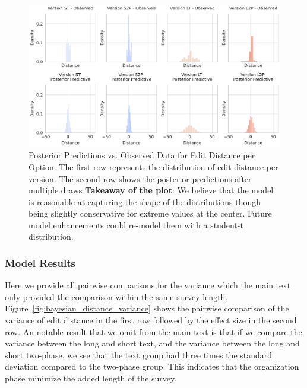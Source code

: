 \begin{figure}[h!]
    \centering
    \includegraphics[width=\textwidth]{content/image/distance/observed_vs_posterior_predictive_histogram_m2.pdf}
    \caption{Posterior Predictions vs. Observed Data for Edit Distance per Option. The first row represents the distribution of edit distance per version. The second row shows the posterior predictions after multiple draws \textbf{Takeaway of the plot}: We believe that the model is reasonable at capturing the shape of the distributions though being slightly conservative for extreme values at the center. Future model enhancements could re-model them with a student-t distribution.}

    \label{fig:observed_vs_posterior_predictive_histogram_m2}
\end{figure}

\subsubsection{Model Results}
Here we provide all pairwise comparisons for the variance which the main text only provided the comparison within the same survey length. Figure~\ref{fig:bayesian_distance_variance} shows the pairwise comparison of the variance of edit distance in the first row followed by the effect size in the second row. An notable result that we omit from the main text is that if we compare the variance between the long and short text, and the variance between the long and short two-phase, we see that the text group had three times the standard deviation compared to the two-phase group. This indicates that the organization phase minimize the added length of the survey.

